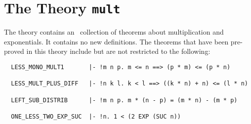 \section{The Theory {\tt mult}}

The theory  contains an
\adhoc\ collection of 
theorems about multiplication and exponentials. It contains no new definitions.
The theorems that have been pre-proved in this theory include but are not
restricted to the following:
\begin{hol}
\begin{verbatim}
  LESS_MONO_MULT1       |- !m n p. m <= n ==> (p * m) <= (p * n)

  LESS_MULT_PLUS_DIFF   |- !n k l. k < l ==> ((k * n) + n) <= (l * n)

  LEFT_SUB_DISTRIB      |- !m n p. m * (n - p) = (m * n) - (m * p)

  ONE_LESS_TWO_EXP_SUC  |- !n. 1 < (2 EXP (SUC n))
\end{verbatim}\end{hol}
